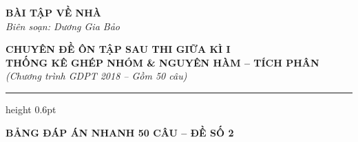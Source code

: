 \documentclass[12pt,a4paper]{article}
\begin{document}
\thispagestyle{firstpage}

\noindent
\begin{minipage}[t]{0.36\textwidth}
    \centering
    {\fontsize{12}{14}\selectfont\textbf{BÀI TẬP VỀ NHÀ}}\\[4pt]
    \textit{Biên soạn: Dương Gia Bảo}\\[6pt]
    \setlength{\fboxrule}{0.8pt}
    \setlength{\fboxsep}{5pt}
\end{minipage}\hfill
\begin{minipage}[t]{0.62\textwidth}
    \centering
    {\fontsize{13}{15}\selectfont\textbf{CHUYÊN ĐỀ ÔN TẬP SAU THI GIỮA KÌ I}}\\[3pt]
    {\fontsize{12}{14}\selectfont\textbf{THỐNG KÊ GHÉP NHÓM \& NGUYÊN HÀM -- TÍCH PHÂN}}\\[3pt]
    {\fontsize{11}{13}\selectfont\textit{(Chương trình GDPT 2018 -- Gồm 50 câu)}}
\end{minipage}

\par\vspace{4pt}
\hrule height 0.6pt
\vspace{8pt}

\begin{center}
    {\fontsize{13}{15}\selectfont\textbf{BẢNG ĐÁP ÁN NHANH 50 CÂU -- ĐỀ SỐ 2}}
\end{center}
\end{document}
